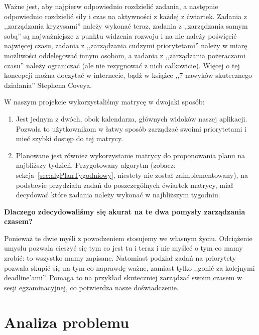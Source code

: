 \documentclass[pdflatex,11pt]{aghdpl}
\begin{document}
\begin{enumerate}
Ważne jest, aby najpierw odpowiednio rozdzielić zadania, a następnie odpowiednio rozdzielić siły i czas na aktywności z każdej z ćwiartek. Zadania z ,,zarządzania kryzysami'' należy wykonać teraz, zadania z ,,zarządzania samym sobą'' są najważniejsze z punktu widzenia rozwoju i na nie należy poświęcić najwięcej czasu, zadania z ,,zarządzania cudzymi priorytetami'' należy w miarę możliwości oddelegować innym osobom, a zadania z ,,zarządzania pożeraczami czasu'' należy ograniczać (ale nie rezygnować z nich całkowicie). Więcej o tej koncepcji można doczytać w internecie, bądź w książce ,,7 nawyków skutecznego działania'' Stephena Coveya.

W naszym projekcie wykorzystaliśmy matrycę w dwojaki sposób:
\begin{enumerate}
\item Jest jednym z dwóch, obok kalendarza, głównych widoków naszej aplikacji. Pozwala to użytkownikom w łatwy sposób zarządzać swoimi priorytetami i mieć szybki dostęp do tej matrycy.

\item Planowane jest również wykorzystanie matrycy do proponowania planu na najbliższy tydzień. Przygotowany algorytm (zobacz: sekcja~\ref{sec:algPlanTygodniowy}, niestety nie został zaimplementowany), na podstawie przydziału zadań do poszczególnych ćwiartek matrycy, miał decydować które zadania należy wykonać w najbliższym tygodniu.

\end{enumerate}

\end{enumerate}

\textbf{Dlaczego zdecydowaliśmy się akurat na te dwa pomysły zarządzania czasem?}

Ponieważ te dwie myśli z powodzeniem stosujemy we własnym życiu. Odciążenie umysłu pozwala cieszyć się tym co jest tu i teraz i nie myśleć o tym co mamy zrobić: to wszystko mamy zapisane. Natomiast podział zadań na priorytety pozwala skupić się na tym co naprawdę ważne, zamiast tylko ,,gonić za kolejnymi deadline'ami''. Pomaga to na przykład skuteczniej zarządzać swoim czasem w sesji egzaminacyjnej, co potwierdza nasze doświadczenie.



\chapter{Analiza problemu}
\end{document}
